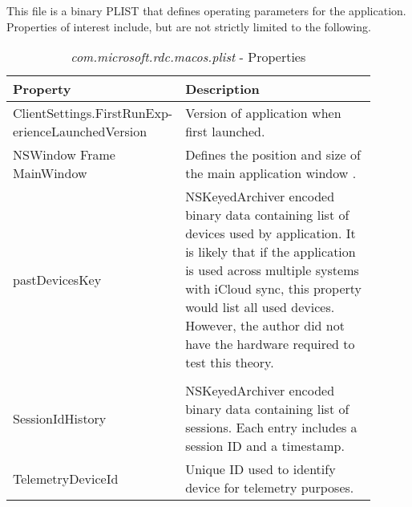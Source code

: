 \documentclass[journal]{IEEEtran}
\begin{document}
This file is a binary PLIST that defines operating parameters for the application. Properties of interest include, but are not strictly limited to the following.
\begin{table}[h!]
\caption{\textit{com.microsoft.rdc.macos.plist} - Properties}
\begin{tabular}{p{0.35\linewidth} | p{0.55\linewidth}}
Property                                           & Description                                                                                                                                                                                                                                                                                       \\ \hline
ClientSettings.FirstRunExp- erienceLaunchedVersion & Version of application when first launched.                                                                                                                                                                                                                                                       \\
NSWindow Frame MainWindow                          & Defines the position and size of the main application window \cite{noauthor_frame_nodate}.                                                                                                                                                                                     \\
pastDevicesKey                                     & NSKeyedArchiver encoded binary data containing list of devices used by application. It is likely that if the application is used across multiple systems with iCloud sync, this property would list all used devices. However, the author did not have the hardware required to test this theory. \\
\\
SessionIdHistory                                   & NSKeyedArchiver encoded binary data containing list of sessions. Each entry includes a session ID and a timestamp.                                                                                                                                                                               
\\
TelemetryDeviceId                                  & Unique ID used to identify device for telemetry purposes.                                                                                                                                                                                                                                         \\

\end{tabular}
\end{table}
\end{document}

